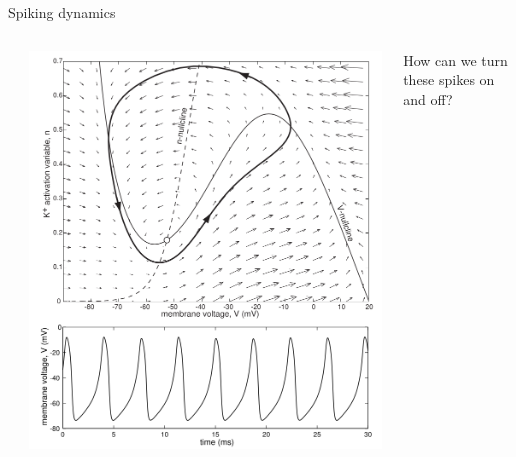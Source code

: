 \documentclass[presentation]{beamer}
\begin{document}
\begin{frame}[label={sec:org32c819f}]{Spiking dynamics}
\begin{columns}
\begin{column}{0.1\columnwidth}
\end{column}

\begin{column}{0.5\columnwidth}
\includegraphics[height=.85\textheight]{./phaseplane.png}
\end{column}

\begin{column}{0.4\columnwidth}
\vfill
How can we turn these spikes on and off?
\vfill
\end{column}
\end{columns}
\end{frame}
\end{document}
